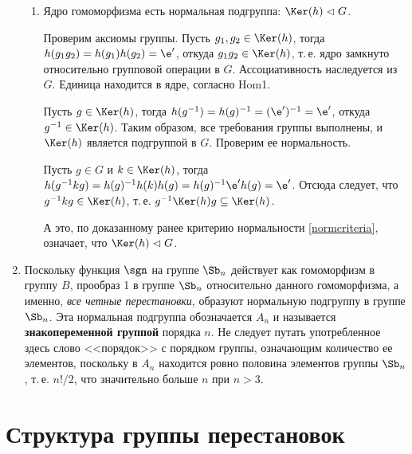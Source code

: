 \begin{enumerate}
\begin{enumerate}[\bf Hom1]
\item Ядро гомоморфизма есть нормальная подгруппа: $\Ker(h)\vartriangleleft G$.

Проверим аксиомы группы. Пусть $g_1, g_2\in \Ker(h)$, тогда $h(g_1g_2)=h(g_1)h(g_2)=\e'$, откуда $g_1g_2\in\Ker(h)$, т.\,е. ядро замкнуто относительно групповой операции в $G$. Ассоциативность наследуется из $G$. Единица находится в ядре, согласно Hom1.

Пусть $g\in\Ker(h)$, тогда $h(g^{-1})=h(g)^{-1}=(\e')^{-1}=\e'$, откуда $g^{-1}\in\Ker(h)$. Таким образом, все требования группы выполнены, и $\Ker(h)$ является подгруппой в $G$. Проверим ее нормальность.

Пусть $g\in G$ и $k\in\Ker(h)$, тогда $h(g^{-1}kg)=h(g)^{-1}h(k)h(g)=h(g)^{-1}\e'h(g)=\e'$. Отсюда следует, что $g^{-1}kg\in\Ker(h)$, т.\,е. $g^{-1}\Ker(h)g\subseteq \Ker(h)$.

А это, по доказанному ранее критерию нормальности \eqref{normcriteria}, означает, что $\Ker(h)\vartriangleleft G$.

\end{enumerate}

\item Поскольку функция $\sgn$ на группе $\Sb_n$ действует как гомоморфизм в группу $B$, прообраз 1 в группе $\Sb_n$ относительно данного гомоморфизма, а именно, \textit{все четные перестановки}, образуют нормальную подгруппу в группе  $\Sb_n$. Эта нормальная подгруппа обозначается $A_n$ и называется \textbf{знакопеременной группой} порядка $n$. Не следует путать употребленное здесь слово <<порядок>> с порядком группы, означающим количество ее элементов, поскольку в $A_n$ находится ровно половина элементов группы $\Sb_n$, т.\,е. $n!/2$, что значительно больше $n$ при $n>3$.

\end{enumerate}



\section{Структура группы перестановок}



